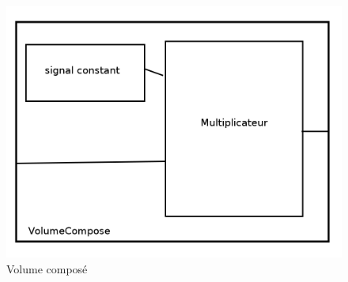 \documentclass{article}
\begin{document}
\begin{figure}
	\begin{center}
		\includegraphics[scale=0.25]{volumeCompose}\\
		Volume composé
	\end{center}
\end{figure}
\end{document}
